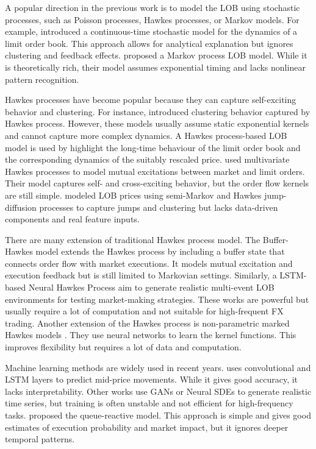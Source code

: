 A popular direction in the previous work is to model the LOB using stochastic processes, such as Poisson processes, Hawkes processes, or Markov models. For example, \cite{cont_stochastic_2010} introduced a continuous-time stochastic model for the dynamics of a limit order book. This approach allows for analytical explanation but ignores clustering and feedback effects. 
\cite{bleher_orders_2021} proposed a Markov process LOB model. While it is theoretically rich, their model assumes exponential timing and lacks nonlinear pattern recognition.

Hawkes processes have become popular because they can capture self-exciting behavior and clustering. For instance, \cite{fonseca_clustering_2015} introduced clustering behavior captured by Hawkes process. However, these models usually assume static exponential kernels and cannot capture more complex dynamics. A Hawkes process-based LOB model is used by \cite{abergel_long-time_2015} highlight the long-time behaviour of the limit order book and the corresponding dynamics of the suitably rescaled price. \cite{zheng_ergodicity_2013} used multivariate Hawkes processes to model mutual excitations between market and limit orders. Their model captures self- and cross-exciting behavior, but the order flow kernels are still simple. \cite{lalor_algorithmic_2025} modeled LOB prices using semi-Markov and Hawkes jump-diffusion processes to capture jumps and clustering but lacks data-driven components and real feature inputs.

There are many extension of traditional Hawkes process model. The Buffer-Hawkes model \citep{kaj_buffer_2017} extends the Hawkes process by including a buffer state that connects order flow with market executions. It models mutual excitation and execution feedback but is still limited to Markovian settings. Similarly, a LSTM-based Neural Hawkes Process \citep{lalor_event-based_2025} aim to generate realistic multi-event LOB environments for testing market-making strategies. These works are powerful but usually require a lot of computation and not suitable for high-frequent FX trading. Another extension of the Hawkes process is non-parametric marked Hawkes models \citep{joseph_non-parametric_2024}. They use neural networks to learn the kernel functions. This improves flexibility but requires a lot of data and computation.

Machine learning methods are widely used in recent years. \cite{briola_deep_2024} uses convolutional and LSTM layers to predict mid-price movements. While it gives good accuracy, it lacks interpretability. Other works use GANs \citep{brophy_quick_2019} or Neural SDEs \citep{issa_non-adversarial_2023} to generate realistic time series, but training is often unstable and not efficient for high-frequency tasks. \cite{huang_simulating_2014} proposed the queue-reactive model. This approach is simple and gives good estimates of execution probability and market impact, but it ignores deeper temporal patterns.

